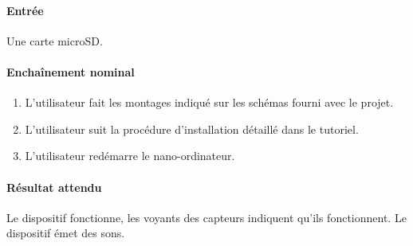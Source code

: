 \documentclass[a4paper, titlepage, oneside, 12pt]{article}%
\begin{document}
\paragraph{Entrée\\}
Une carte microSD.

\paragraph{Enchaînement nominal}
\begin {enumerate}
\item L'utilisateur fait les montages indiqué sur les schémas fourni avec le projet.
\item L'utilisateur suit la procédure d'installation détaillé dans le tutoriel.
\item L'utilisateur redémarre le nano-ordinateur.
\end{enumerate}

\paragraph{Résultat attendu\\}
Le dispositif fonctionne, les voyants des capteurs indiquent qu'ils fonctionnent. Le dispositif émet des sons.
\end{document}
